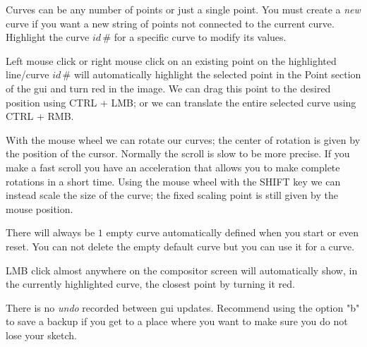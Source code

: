 Curves can be any number of points or just a single point.
You must create a \textit{new} curve if you want a new string of points not connected to the current curve.
Highlight the curve $id\,\#$ for a specific curve to modify its values.
{Left mouse click or right mouse click on an existing point on the highlighted line/curve $id\,\#$ will automatically highlight the selected point in the Point section of the gui and turn red in the image. We can drag this point to the desired position using CTRL + LMB; or we can translate the entire selected curve using CTRL + RMB.
	
With the mouse wheel we can rotate our curves; the center of rotation is given by the position of the cursor. Normally the scroll is slow to be more precise. If you make a fast scroll you have an acceleration that allows you to make complete rotations in a short time. Using the mouse wheel with the SHIFT key we can instead scale the size of the curve; the fixed scaling point is still given by the mouse position. 

There will always be $1$ empty curve automatically defined when you start or even reset.
You can not delete the empty default curve but you can use it for a curve.

LMB click almost anywhere on the compositor screen will automatically show, in the currently highlighted curve, the closest point by turning it red.

There is no \textit{undo} recorded between gui updates. Recommend using the option "b" to save a backup if you get to a place where you want to make sure you do not lose your sketch.

}
